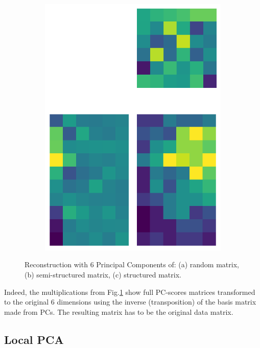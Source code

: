 \documentclass[10pt,twocolumn]{article}
\begin{document}
\begin{figure}[H]
\begin{subfigure}[t]{.15\textwidth}
\includegraphics[scale=.2]{DWGs/structured-matrix-reconstruction-PCs-6.png}
\caption{ }
\end{subfigure}
\caption{Reconstruction with 6 Principal Components of: (a) random matrix, (b) semi-structured matrix, (c) structured matrix.}
\label{fig:matrices-reconstruction-6}
\end{figure}

Indeed, the multiplications from Fig.\ref{fig:matrices-reconstruction-6} show full PC-scores matrices transformed to the original 6 dimensions using the inverse (transposition) of the basis matrix made from PCs. The resulting matrix has to be the original data matrix.



\subsection{Local PCA}
\end{document}
